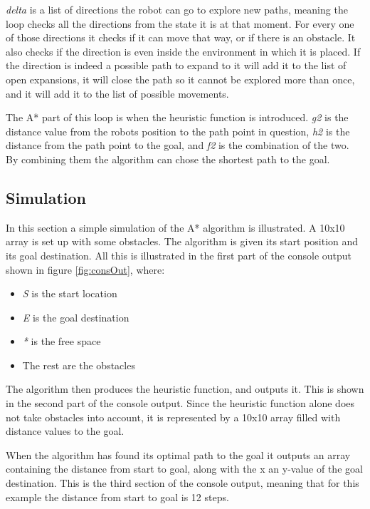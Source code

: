 \emph{delta} is a list of directions the robot can go to explore new paths, meaning the loop checks all the directions from the state it is at that moment. For every one of those directions it checks if it can move that way, or if there is an obstacle. It also checks if the direction is even inside the environment in which it is placed. If the direction is indeed a possible path to expand to it will add it to the list of open expansions, it will close the path so it cannot be explored more than once, and it will add it to the list of possible movements.

The A* part of this loop is when the heuristic function is introduced. \emph{g2} is the distance value from the robots position to the path point in question, \emph{h2} is the distance from the path point to the goal, and \emph{f2} is the combination of the two. By combining them the algorithm can chose the shortest path to the goal.

\subsection{Simulation}
In this section a simple simulation of the A* algorithm is illustrated. A 10x10 array is set up with some obstacles. The algorithm is given its start position and its goal destination. All this is illustrated in the first part of the console output shown in figure \ref{fig:consOut}, where:

\begin{itemize}
	\item \emph{S} is the start location
	\item \emph{E} is the goal destination
	\item \emph{*} is the free space
	\item The rest are the obstacles
\end{itemize}

The algorithm then produces the heuristic function, and outputs it. This is shown in the second part of the console output. Since the heuristic function alone does not take obstacles into account, it is represented by a 10x10 array filled with distance values to the goal. 

When the algorithm has found its optimal path to the goal it outputs an array containing the distance from start to goal, along with the x an y-value of the goal destination. This is the third section of the console output, meaning that for this example the distance from start to goal is 12 steps. 

